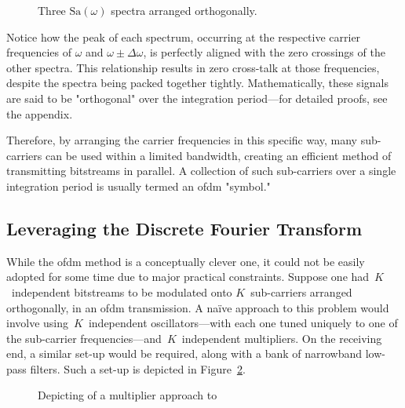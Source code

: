 \documentclass[class=report,11pt,crop=false]{standalone}
\begin{document}
\begin{figure}[htbp]
    \centering
    \captionsetup{type=figure}
    \def\svgwidth{0.8\linewidth}
    { %
        }
    \caption{Three \(\mathrm{Sa}(\omega)\) spectra arranged orthogonally.}
    \label{fig:ofdm-three-sincs}
\end{figure}

Notice how the peak of each spectrum, occurring at the respective carrier frequencies of \(\omega\) and \(\omega\pm\Delta\omega\), is perfectly aligned with the zero crossings of the other spectra. This relationship results in zero cross-talk at those frequencies, despite the spectra being packed together tightly. Mathematically, these signals are said to be "orthogonal" over the integration period---for detailed proofs, see the appendix.

Therefore, by arranging the carrier frequencies in this specific way, many sub-carriers can be used within a limited bandwidth, creating an efficient method of transmitting bitstreams in parallel. A collection of such sub-carriers over a single integration period is usually termed an \gls{ofdm} "symbol."

\subsection{Leveraging the Discrete Fourier Transform \label{subsect:dab-std_dft}}
While the \gls{ofdm} method is a conceptually clever one, it could not be easily adopted for some time due to major practical constraints. Suppose one had~\(K\)~independent bitstreams to be modulated onto \(K\)~sub-carriers arranged orthogonally, in an \gls{ofdm} transmission. A na\"ive approach to this problem would involve using~\(K\)~independent oscillators---with each one tuned uniquely to one of the sub-carrier frequencies---and~\(K\)~independent multipliers. On the receiving end, a similar set-up would be required, along with a bank of narrowband low-pass filters. Such a set-up is depicted in Figure~\ref{fig:ofdm-multipliers}.

\begin{figure}
    \centering
    \captionsetup{type=figure}
    \def\svgwidth{0.90\linewidth}
    {
        \scriptsize
        
    }
    \caption{Depicting of a multiplier approach to }
    \label{fig:ofdm-multipliers}
\end{figure}
\end{document}
